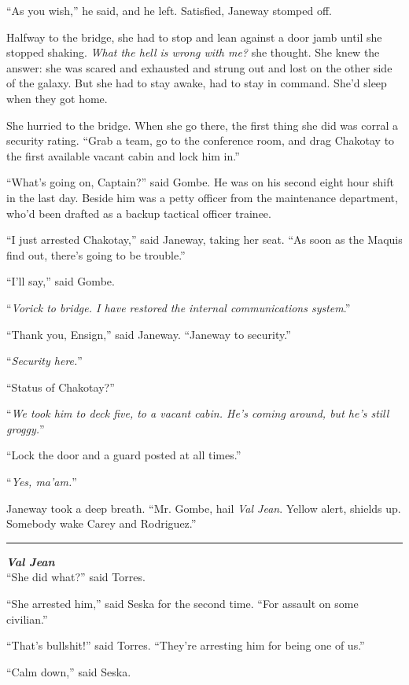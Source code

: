 \documentclass[twoside,letterpaper,12pt]{memoir}
\begin{document}
``As you wish,'' he said, and he left. Satisfied, Janeway stomped off.

Halfway to the bridge, she had to stop and lean against a door jamb until she stopped shaking. \textit{What the hell is wrong with me?} she thought. She knew the answer: she was scared and exhausted and strung out and lost on the other side of the galaxy. But she had to stay awake, had to stay in command. She'd sleep when they got home.

She hurried to the bridge. When she go there, the first thing she did was corral a security rating. ``Grab a team, go to the conference room, and drag Chakotay to the first available vacant cabin and lock him in.''

``What's going on, Captain?'' said Gombe. He was on his second eight hour shift in the last day. Beside him was a petty officer from the maintenance department, who'd been drafted as a backup tactical officer trainee.

``I just arrested Chakotay,'' said Janeway, taking her seat. ``As soon as the Maquis find out, there's going to be trouble.''

``I'll say,'' said Gombe.

``\textit{Vorick to bridge. I have restored the internal communications system}.''

``Thank you, Ensign,'' said Janeway. ``Janeway to security.''

``\textit{Security here.}''

``Status of Chakotay?''

``\textit{We took him to deck five, to a vacant cabin. He’s coming around, but he’s still groggy.}''

``Lock the door and a guard posted at all times.''

``\textit{Yes, ma'am.}''

Janeway took a deep breath. ``Mr. Gombe, hail \textit{Val Jean}. Yellow alert, shields up. Somebody wake Carey and Rodriguez.''

\fancybreak{\rule{3cm}{0.4 pt}}
\noindent\textit{\textbf{Val Jean}}\\

``She did what?'' said Torres.

``She arrested him,'' said Seska for the second time. ``For assault on some civilian.''

``That's bullshit!'' said Torres. ``They're arresting him for being one of us.''

``Calm down,'' said Seska.
\end{document}
